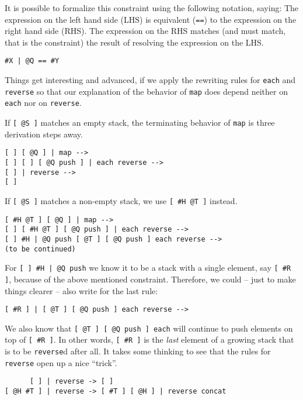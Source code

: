It is possible to formalize this constraint using the following notation, saying: The expression on the left hand side (LHS) is equivalent (\verb|==|) to the expression on the right hand side (RHS). The expression on the RHS matches (and must match, that is the constraint) the result of resolving the expression on the LHS.

\begin{verbatim}
#X | @Q == #Y
\end{verbatim}

Things get interesting and advanced, if we apply the rewriting rules for \verb|each| and \verb|reverse| so that our explanation of the behavior of \verb|map| does depend neither on \verb|each| nor on \verb|reverse|.

If \verb|[ @S ]| matches an empty stack, the terminating behavior of \verb|map| is three derivation steps away.

\begin{verbatim}
[ ] [ @Q ] | map -->
[ ] [ ] [ @Q push ] | each reverse -->
[ ] | reverse -->
[ ]
\end{verbatim}

If \verb|[ @S ]| matches a non-empty stack, we use \verb|[ #H @T ]| instead.

\begin{verbatim}
[ #H @T ] [ @Q ] | map -->
[ ] [ #H @T ] [ @Q push ] | each reverse -->
[ ] #H | @Q push [ @T ] [ @Q push ] each reverse -->
(to be continued)
\end{verbatim}

For \verb![ ] #H | @Q push! we know it to be a stack with a single element, say \verb|[ #R ]|, because of the above mentioned constraint. Therefore, we could -- just to make things clearer -- also write for the last rule:

\begin{verbatim}
[ #R ] | [ @T ] [ @Q push ] each reverse -->
\end{verbatim}

We also know that \verb|[ @T ] [ @Q push ] each| will continue to push elements on top of \verb|[ #R ]|. In other words, \verb|[ #R ]| is the \emph{last} element of a growing stack that is to be \verb|reverse|d after all. It takes some thinking to see that the rules for \verb|reverse| open up a nice ``trick''.

\begin{verbatim}
      [ ] | reverse -> [ ]
[ @H #T ] | reverse -> [ #T ] [ @H ] | reverse concat
\end{verbatim}

